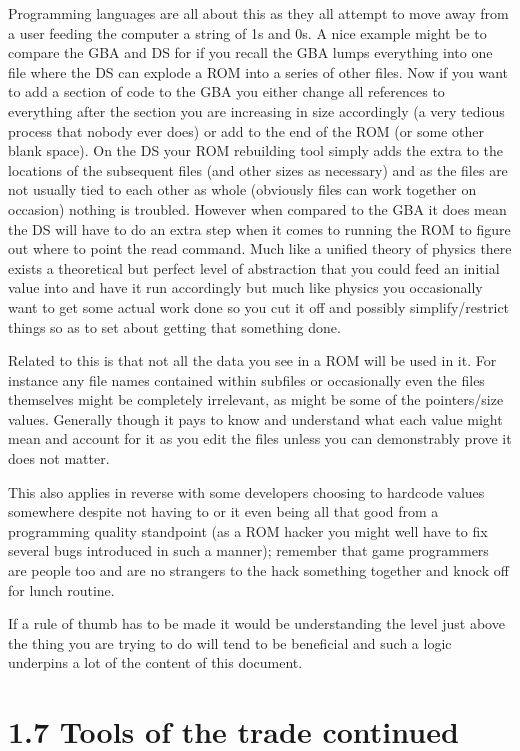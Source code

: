 \documentclass[
]{book}
\begin{document}
Programming languages are all about this as they all attempt to move away from a user feeding the computer a string of 1s and 0s. A nice example might be to compare the GBA and DS for if you recall the GBA lumps everything into one file where the DS can explode a ROM into a series of other files. Now if you want to add a section of code to the GBA you either change all references to everything after the section you are increasing in size accordingly (a very tedious process that nobody ever does) or add to the end of the ROM (or some other blank space). On the DS your ROM rebuilding tool simply adds the extra to the locations of the subsequent files (and other sizes as necessary) and as the files are not usually tied to each other as whole (obviously files can work together on occasion) nothing is troubled. However when compared to the GBA it does mean the DS will have to do an extra step when it comes to running the ROM to figure out where to point the read command. Much like a unified theory of physics there exists a theoretical but perfect level of abstraction that you could feed an initial value into and have it run accordingly but much like physics you occasionally want to get some actual work done so you cut it off and possibly simplify/restrict things so as to set about getting that something done.

Related to this is that not all the data you see in a ROM will be used in it. For instance any file names contained within subfiles or occasionally even the files themselves might be completely irrelevant, as might be some of the pointers/size values. Generally though it pays to know and understand what each value might mean and account for it as you edit the files unless you can demonstrably prove it does not matter.

This also applies in reverse with some developers choosing to hardcode values somewhere despite not having to or it even being all that good from a programming quality standpoint (as a ROM hacker you might well have to fix several bugs introduced in such a manner); remember that game programmers are people too and are no strangers to the hack something together and knock off for lunch routine.

If a rule of thumb has to be made it would be understanding the level just above the thing you are trying to do will tend to be beneficial and such a logic underpins a lot of the content of this document.

\hypertarget{tools-of-the-trade-continued}{%
\section{1.7 Tools of the trade continued}\label{tools-of-the-trade-continued}}
\end{document}
